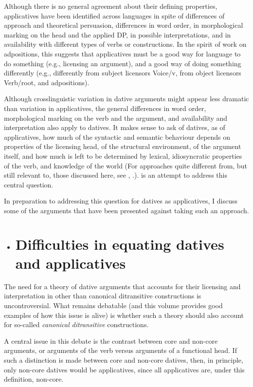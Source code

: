 \documentclass[output=paper,modfonts,nonflat]{langsci/langscibook}
\begin{document}
Although there is no general agreement about their defining properties, applicatives have been identified across languages in spite of differences of approach and theoretical persuasion, differences in word order, in morphological marking on the head and the applied DP, in possible interpretations, and in availability with different types of verbs or constructions. In the spirit of  work on adpositions, this suggests that applicatives must be a good way for language to do something (e.g., licensing an argument), and a good way of doing something differently (e.g., differently from subject licensors Voice/v, from object licensors Verb/root, and adpositions).

Although crosslinguistic variation in dative arguments might appear less dramatic than variation in applicatives, the general differences in word order, morphological marking on the verb and the argument, and availability and interpretation also apply to datives. It makes sense to ask of datives, as of applicatives, how much of the syntactic and semantic behaviour depends on properties of the licensing head, of the structural environment, of the argument itself, and how much is left to be determined by lexical, idiosyncratic properties of the verb, and knowledge of the world (For approaches quite different from, but still relevant to, those discussed here, see \citealt{Grimm2011}, \citealt{Maling2001}.).  is an attempt to address this central question. 

In preparation to addressing this question for datives as applicatives, I discuss some of the arguments that have been presented against taking such an approach.

\begin{itemize}
\item \section{Difficulties in equating datives and applicatives} 
\end{itemize}

The need for a theory of dative arguments that accounts for their licensing and interpretation in other than canonical ditransitive constructions is uncontroversial. What remains debatable (and this volume provides good examples of how this issue is alive) is whether such a theory should also account for so-called \textit{canonical} \textit{ditransitive} constructions. 

A central issue in this debate is the contrast between core and non-core arguments, or arguments of the verb versus arguments of a functional head. If such a distinction is made between core and non-core datives, then, in principle, only non-core datives would be applicatives, since all applicatives are, under this definition, non-core. 
\end{document}
